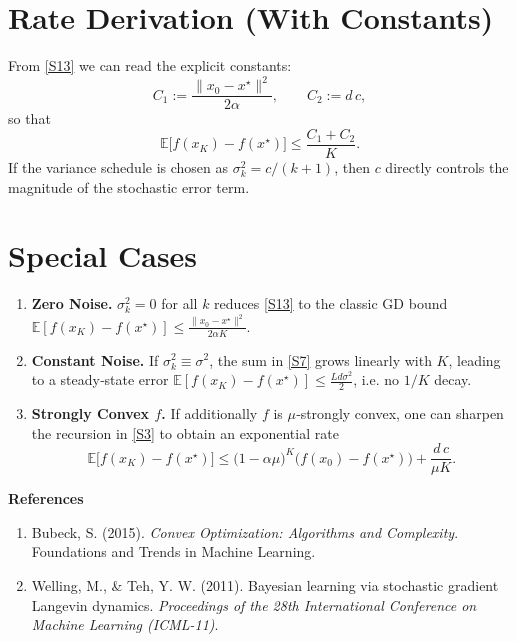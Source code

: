 \documentclass[11pt]{article}
\newcommand{\EE}{\mathbb{E}}
\begin{document}
\section*{Rate Derivation (With Constants)}
From \eqref{S13} we can read the explicit constants:
\[
C_{1}:=\frac{\|x_{0}-x^{\star}\|^{2}}{2\alpha},\qquad
C_{2}:=d\,c,
\]
so that
\[
\EE\!\big[f(x_{K})-f(x^{\star})\big]\le \frac{C_{1}+C_{2}}{K}.
\]
If the variance schedule is chosen as $\sigma_{k}^{2}=c/(k+1)$, then $c$ directly controls the magnitude of the stochastic error term.

\section*{Special Cases}
\begin{enumerate}
\item \textbf{Zero Noise.} $\sigma_{k}^{2}=0$ for all $k$ reduces \eqref{S13} to the classic GD bound $\EE[f(x_{K})-f(x^{\star})]\le \frac{\|x_{0}-x^{\star}\|^{2}}{2\alpha K}$.
\item \textbf{Constant Noise.} If $\sigma_{k}^{2}\equiv \sigma^{2}$, the sum in \eqref{S7} grows linearly with $K$, leading to a steady‑state error $\EE[f(x_{K})-f(x^{\star})]\le \frac{L d\sigma^{2}}{2}$, i.e. no $1/K$ decay.
\item \textbf{Strongly Convex $f$.} If additionally $f$ is $\mu$‑strongly convex, one can sharpen the recursion in \eqref{S3} to obtain an exponential rate
\[
\EE\!\big[f(x_{K})-f(x^{\star})\big]\le
\big(1-\alpha\mu\big)^{K}\big(f(x_{0})-f(x^{\star})\big)+\frac{d\,c}{\mu K}.
\]
\end{enumerate}

\bigskip
\noindent\textbf{References}
\begin{enumerate}
\item Bubeck, S. (2015). \emph{Convex Optimization: Algorithms and Complexity}. Foundations and Trends in Machine Learning.
\item Welling, M., \& Teh, Y. W. (2011). Bayesian learning via stochastic gradient Langevin dynamics. \emph{Proceedings of the 28th International Conference on Machine Learning (ICML-11)}.
\end{enumerate}
\end{document}
